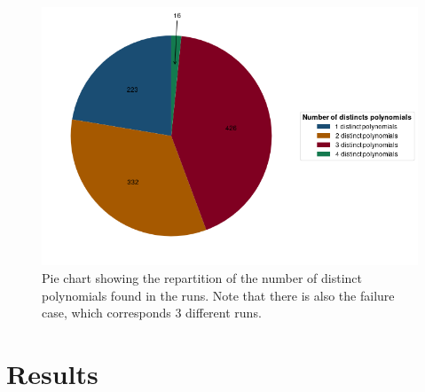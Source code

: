 \documentclass[11pt]{article}
\begin{document}
\begin{figure}[h!]
	\centering
	\includegraphics[scale=0.5]{Figures/piechart_results_n_pol_each_run.png}
	\caption{Pie chart showing the repartition of the number of distinct polynomials found in the runs. Note that there is also the failure case, which corresponds 3 different runs.}
	\label{fig:piechart}
\end{figure}

\section{Results}
\end{document}
